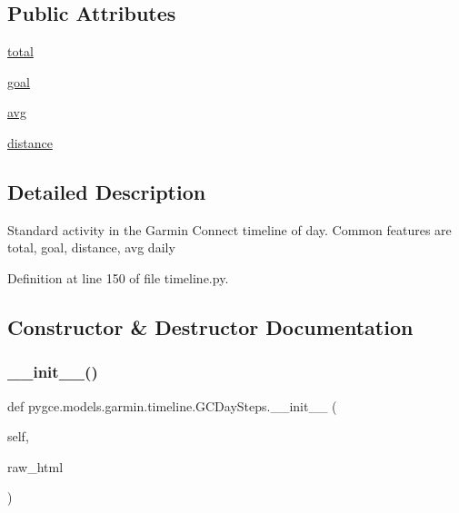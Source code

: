\subsection*{Public Attributes}
\begin{DoxyCompactItemize}
\item 
\hyperlink{classpygce_1_1models_1_1garmin_1_1timeline_1_1_g_c_day_steps_accaf8fa0f07a44164f5e2ee3a4c5fca7}{total}
\item 
\hyperlink{classpygce_1_1models_1_1garmin_1_1timeline_1_1_g_c_day_steps_a60204221cb98c4d801fa4265c2dbf5ef}{goal}
\item 
\hyperlink{classpygce_1_1models_1_1garmin_1_1timeline_1_1_g_c_day_steps_a598091ff91043c28a7bb4711f861ff71}{avg}
\item 
\hyperlink{classpygce_1_1models_1_1garmin_1_1timeline_1_1_g_c_day_steps_a3fe1eac606ace83c095f9c376d1e09ba}{distance}
\end{DoxyCompactItemize}


\subsection{Detailed Description}
\begin{DoxyVerb}Standard activity in the Garmin Connect timeline of day.
Common features are total, goal, distance, avg daily
\end{DoxyVerb}
 

Definition at line 150 of file timeline.\+py.



\subsection{Constructor \& Destructor Documentation}
\mbox{\label{classpygce_1_1models_1_1garmin_1_1timeline_1_1_g_c_day_steps_a0b8cc0a273e2a35d5326b3e06c39e4a1}} 
\subsubsection{\texorpdfstring{\+\_\+\+\_\+init\+\_\+\+\_\+()}{\_\_init\_\_()}}
{\footnotesize\ttfamily def pygce.\+models.\+garmin.\+timeline.\+G\+C\+Day\+Steps.\+\_\+\+\_\+init\+\_\+\+\_\+ (\begin{DoxyParamCaption}\item[{}]{self,  }\item[{}]{raw\+\_\+html }\end{DoxyParamCaption})}


